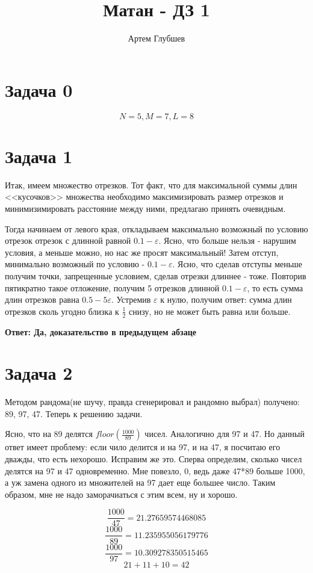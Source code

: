 \documentclass[11pt]{article}
\title{Матан - ДЗ 1}
\author{Артем Глубшев}
\date{}
\begin{document}
\maketitle

\section{Задача 0}
$$N = 5, M=7, L=8$$
\section{Задача 1}

Итак, имеем множество отрезков. Тот факт, что для максимальной суммы длин <<кусочков>> множества необходимо максимизировать размер отрезков и минимизимировать расстояние между ними, предлагаю принять очевидным.

Тогда начинаем от левого края, откладываем максимально возможный по условию отрезок отрезок с длинной равной $0.1-\varepsilon$. Ясно, что больше нельзя - нарушим условия, а меньше можно, но нас же просят максимальный! Затем отступ, минимально возможный по условию - $0.1-\varepsilon$. Ясно, что сделав отступы меньше получим точки, запрещенные условием, сделав отрезки длиннее - тоже. Повторив пятикратно такое отложение, получим 5 отрезков длинной $0.1 -	\varepsilon$, то есть сумма длин отрезков равна $0.5-5\varepsilon$. Устремив $\varepsilon$ к нулю, получим ответ: сумма длин отрезков сколь угодно близка к $\frac12$ снизу, но не может быть равна или больше. 

\textbf{Ответ: Да, доказательство в предыдущем абзаце}

\section{Задача 2}

Методом рандома(не шучу, правда сгенерировал и рандомно выбрал) получено: 89, 97, 47. Теперь к решению задачи.

Ясно, что на 89 делятся $floor(\frac{1000}{89})$ чисел. Аналогично для 97 и 47. Но данный ответ имеет проблему: если чило делится и на 97, и на 47, я посчитаю его дважды, что есть нехорошо. Исправим же это. Сперва определим, сколько чисел делятся на 97 и 47 одновременно. Мне повезло, 0, ведь даже 47*89 больше 1000, а уж замена одного из множителей на 97 дает еще большее число. Таким образом, мне не надо заморачиаться с этим всем, ну и хорошо.

$$
\frac{1000}{47} = 21.27659574468085
$$$$
\frac{1000}{89} = 11.235955056179776
$$$$
\frac{1000}{97} = 10.309278350515465
$$$$
21+11+10=42
$$
\end{document}
